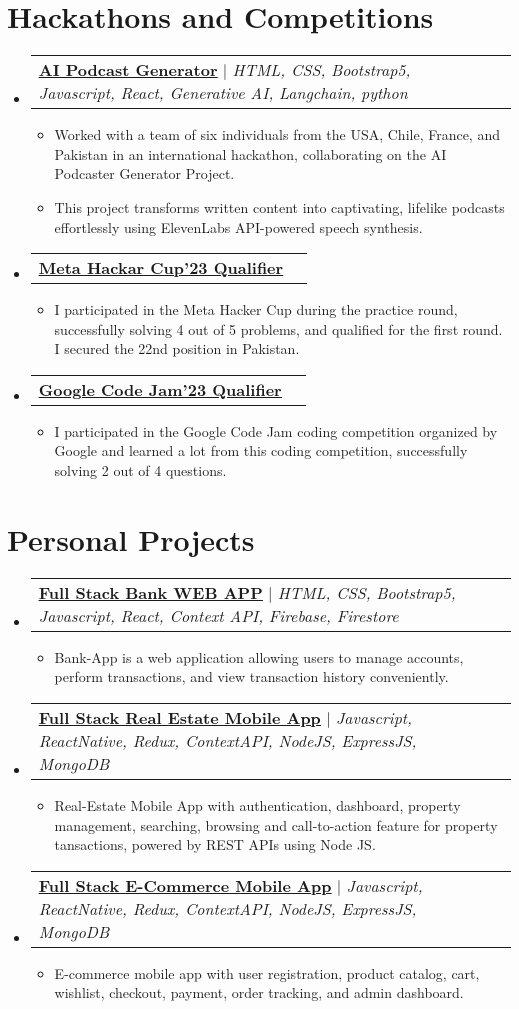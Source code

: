 \documentclass[letterpaper,11pt]{article}
\makeatletter
\newcommand{\resumeItem}[1]{
  \item\small{
    {#1 \vspace{-2pt}}
  }
}
\newcommand{\resumeProjectHeading}[2]{
    \item
    \begin{tabular*}{0.97\textwidth}{l@{\extracolsep{\fill}}r}
      \small#1 & #2 \\
    \end{tabular*}\vspace{-7pt}
}
\newcommand{\resumeSubHeadingListStart}{\begin{itemize}[leftmargin=0.15in, label={}]}
\newcommand{\resumeSubHeadingListEnd}{\end{itemize}}
\newcommand{\resumeItemListStart}{\begin{itemize}}
\newcommand{\resumeItemListEnd}{\end{itemize}\vspace{-5pt}}
\makeatother
\begin{document}
\section{Hackathons and Competitions}
\resumeSubHeadingListStart
\resumeProjectHeading
{\textbf{\href{https://github.com/Louvivien/AIpodcastgenerator}{\underline{AI Podcast Generator}}} $|$ \emph{HTML, CSS, Bootstrap5, Javascript, React, Generative AI, Langchain, python}}{}
\resumeItemListStart
\resumeItem{Worked with a team of six individuals from the USA, Chile, France, and Pakistan in an international hackathon, collaborating on the AI Podcaster Generator Project.}
\resumeItem{This project transforms written content into captivating, lifelike podcasts effortlessly using ElevenLabs API-powered speech synthesis.}
\resumeItemListEnd
\resumeProjectHeading
{\textbf{\href{https://shorturl.at/kHNZ2}{\underline{Meta Hackar Cup'23 Qualifier}}}}{}
\resumeItemListStart
\resumeItem{I participated in the Meta Hacker Cup during the practice round, successfully solving 4 out of 5 problems, and qualified for the first round. I secured the 22nd position in Pakistan.}
\resumeItemListEnd
\resumeProjectHeading
{\textbf{\href{https://shorturl.at/myRTX}{\underline{Google Code Jam'23 Qualifier}}}}{}
\resumeItemListStart
\resumeItem{I participated in the Google Code Jam coding competition organized by Google and learned a lot from this coding competition, successfully solving 2 out of 4 questions.}
\resumeItemListEnd
\resumeSubHeadingListEnd
%


\section{Personal Projects}
\resumeSubHeadingListStart
\resumeProjectHeading
{\textbf{\href{https://github.com/Ahmadjajja/React_Bank}{\underline{Full Stack Bank WEB APP}}} $|$ \emph{HTML, CSS, Bootstrap5, Javascript, React, Context API, Firebase, Firestore}}{}
\resumeItemListStart
\resumeItem{Bank-App is a web application allowing users to manage accounts, perform
  transactions, and view transaction history conveniently.}
\resumeItemListEnd
\resumeProjectHeading
{\textbf{\href{https://github.com/Ahmadjajja/Social_Real_Estate_System_Mobile_App_Frontend}{\underline{Full Stack Real Estate Mobile App}}} $|$ \emph{Javascript, ReactNative, Redux, ContextAPI, NodeJS,
    ExpressJS, MongoDB}}{}
\resumeItemListStart
\resumeItem{Real-Estate Mobile App with authentication, dashboard, property
  management, searching, browsing and call-to-action feature for property
  tansactions, powered by REST APIs using Node JS.}
\resumeItemListEnd
\resumeProjectHeading
{\textbf{\href{https://github.com/Ahmadjajja/E_Commerce_Mobile_App_Frontend}{\underline{Full Stack E-Commerce Mobile App}}} $|$ \emph{Javascript, ReactNative, Redux, ContextAPI, NodeJS,
    ExpressJS, MongoDB}}{}
\resumeItemListStart
\resumeItem{E-commerce mobile app with user registration, product catalog, cart, wishlist,
  checkout, payment, order tracking, and admin dashboard.}
\resumeItemListEnd
\resumeSubHeadingListEnd
%
\end{document}
